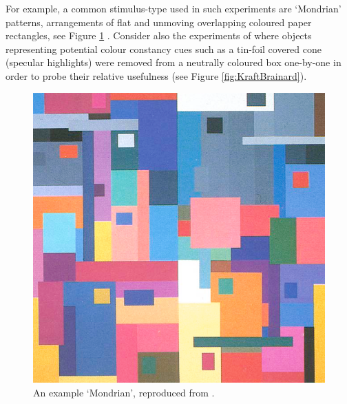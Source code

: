 For example, a common stimulus-type used in such experiments are `Mondrian' patterns, arrangements of flat and unmoving overlapping coloured paper rectangles, see Figure \ref{fig:mondrian} \citep{hurlbert_colour_1999}. Consider also the experiments of \citet{kraft_mechanisms_1999} where objects representing potential colour constancy cues such as a tin-foil covered cone (specular highlights) were removed from a neutrally coloured box one-by-one in order to probe their relative usefulness (see Figure \ref{fig:KraftBrainard}).

\begin{figure}[hbp]
\includegraphics[max width=\textwidth]{figs/tablet/mondrian.png}
\caption{An example `Mondrian', reproduced from \citet{land_recent_1986}.}
\label{fig:mondrian}
\end{figure}


